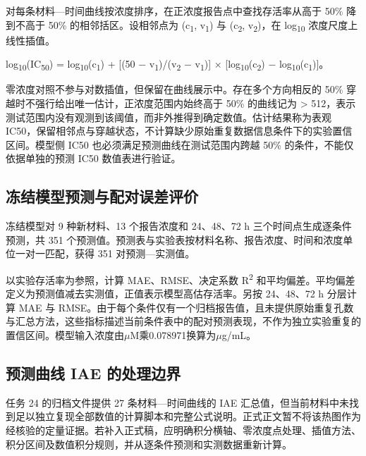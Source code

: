 对每条材料—时间曲线按浓度排序，在正浓度报告点中查找存活率从高于 50\% 降到不高于 50\% 的相邻括区。设相邻点为 (c\textsubscript{1}, v\textsubscript{1}) 与 (c\textsubscript{2}, v\textsubscript{2})，在 log\textsubscript{1}\textsubscript{0} 浓度尺度上线性插值。

log\textsubscript{1}\textsubscript{0}(IC\textsubscript{5}\textsubscript{0}) = log\textsubscript{1}\textsubscript{0}(c\textsubscript{1}) + [(50 \ensuremath{\mathord{-}} v\textsubscript{1})/(v\textsubscript{2} \ensuremath{\mathord{-}} v\textsubscript{1})] \ensuremath{\times} [log\textsubscript{1}\textsubscript{0}(c\textsubscript{2}) \ensuremath{\mathord{-}} log\textsubscript{1}\textsubscript{0}(c\textsubscript{1})]。

零浓度对照不参与对数插值，但保留在曲线展示中。存在多个方向相反的 50\% 穿越时不强行给出唯一估计，正浓度范围内始终高于 50\% 的曲线记为 > 512，表示测试范围内没有观测到该阈值，而非外推得到确定数值。估计结果称为表观 IC50，保留相邻点与穿越状态，不计算缺少原始重复数据信息条件下的实验置信区间。模型侧 IC50 也必须满足预测曲线在测试范围内跨越 50\% 的条件，不能仅依据单独的预测 IC50 数值表进行验证。

\subsection{冻结模型预测与配对误差评价}

冻结模型对 9 种新材料、13 个报告浓度和 24、48、72 h 三个时间点生成逐条件预测，共 351 个预测值。预测表与实验表按材料名称、报告浓度、时间和浓度单位一对一匹配，获得 351 对预测—实测值。

以实验存活率为参照，计算 MAE、RMSE、决定系数 R\textsuperscript{2} 和平均偏差。平均偏差定义为预测值减去实测值，正值表示模型高估存活率。另按 24、48、72 h 分层计算 MAE 与 RMSE。由于每个条件仅有一个归档报告值，且未提供原始重复孔数与汇总方法，这些指标描述当前条件表中的配对预测表现，不作为独立实验重复的置信区间。模型输入浓度由$\mu$M乘0.078971换算为$\mu$g/mL。

\subsection{预测曲线 IAE 的处理边界}

任务 24 的归档文件提供 27 条材料—时间曲线的 IAE 汇总值，但当前材料中未找到足以独立复现全部数值的计算脚本和完整公式说明。正式正文暂不将该热图作为经核验的定量证据。若补入正式稿，应明确积分横轴、零浓度点处理、插值方法、积分区间及数值积分规则，并从逐条件预测和实测数据重新计算。

